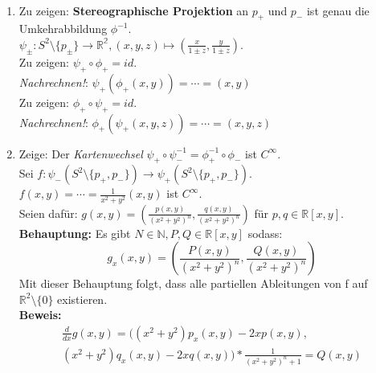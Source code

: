 \begin{solution}
  \
  \begin{enumerate}[label=(\alph*)]
    \item Zu zeigen: \textbf{Stereographische Projektion} an \( p_+ \) und \( p_- \) ist genau die Umkehrabbildung \( \phi^{-1} \). \\
    \( \psi_\pm : S^2 \setminus \{ p_\pm \} \to \mathbb{R^2}, (x,y,z) \mapsto (\frac{x}{1\pm z},\frac{y}{1\pm z}) \). \\
    Zu zeigen: \( \psi_+ \circ \phi_+ = id \). \\ \emph{Nachrechnen!}: \( \psi_+ (\phi_+ (x,y)) = \cdots = (x,y) \) \\
    Zu zeigen: \( \phi_+ \circ \psi_+ = id \). \\ \emph{Nachrechnen!}: \( \phi_+ (\psi_+ (x,y,z)) = \cdots = (x,y,z) \) 
    
    \item Zeige: Der \emph{Kartenwechsel} \( \psi_+ \circ \psi_-^{-1} = \phi_+^{-1} \circ \phi_- \) ist \( C^{\infty} \). \\
    Sei \( f: \psi_- (S^{2} \setminus \{ p_+, p_- \}) \to \psi_+(S^{2} \setminus \{ p_+, p_- \}) \). \\
    \( f(x,y) = \cdots = \frac{1}{x^2 + y^2}(x,y) \) ist \( C^{\infty} \). \\
    Seien dafür: \( g(x,y) = (\frac{p(x,y)}{{(x^2 + y^2)}^n}, \frac{q(x,y)}{{(x^2 + y^2)}^n}) \) für \( p,q \in \mathbb{R}[x,y] \). \\
    \textbf{Behauptung:} Es gibt \( N \in \mathbb{N}, P, Q \in \mathbb{R}[x,y] \) sodass:
    \begin{equation*}
      g_x(x,y) = \left(\frac{P(x,y)}{{(x^2 + y^2)}^n}, \frac{Q(x,y)}{{(x^2 + y^2)}^n} \right)
    \end{equation*}
    Mit dieser Behauptung folgt, dass alle partiellen Ableitungen von f auf \( \mathbb{R}^2 \setminus \{ 0 \} \) existieren. \\
    \textbf{Beweis:}
    \begin{align*}
      \frac{d}{dx} g(x,y) = ((x^2 + y^2) p_x(x,y) - 2x p(x,y), \\
      (x^2 + y^2) q_x(x,y) - 2x q(x,y))
      * \frac{1}{{(x^2 + y^2)}^n+1} = Q(x,y)
    \end{align*}
  \end{enumerate}
\end{solution}

